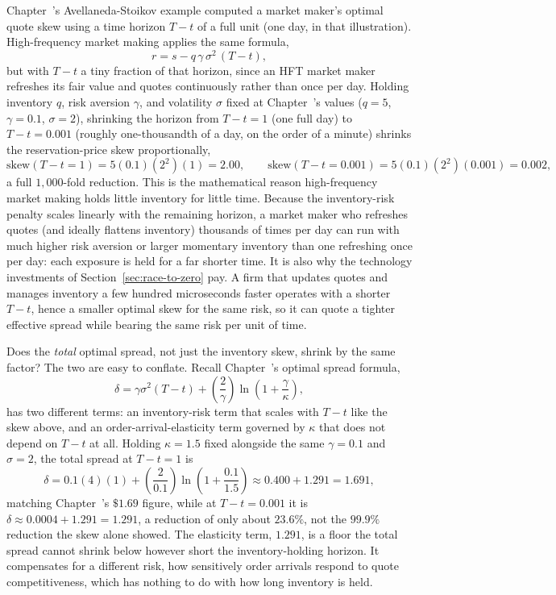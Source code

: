 \documentclass[../ai_in_finance]{subfiles}
\begin{document}
Chapter~'s Avellaneda-Stoikov example computed a market maker's optimal quote skew using a time horizon $T-t$ of a full unit (one day, in that illustration). High-frequency market making applies the same formula,
\begin{equation}
r = s - q\,\gamma\,\sigma^2\,(T-t),
\label{eq:hft-reservation}
\end{equation}
but with $T-t$ a tiny fraction of that horizon, since an HFT market maker refreshes its fair value and quotes continuously rather than once per day. Holding inventory $q$, risk aversion $\gamma$, and volatility $\sigma$ fixed at Chapter~'s values ($q=5$, $\gamma=0.1$, $\sigma=2$), shrinking the horizon from $T-t=1$ (one full day) to $T-t=0.001$ (roughly one-thousandth of a day, on the order of a minute) shrinks the reservation-price skew proportionally,
\begin{equation*}
\text{skew}(T{-}t=1) = 5(0.1)(2^2)(1) = 2.00, \qquad \text{skew}(T{-}t=0.001) = 5(0.1)(2^2)(0.001) = 0.002,
\end{equation*}
a full $1{,}000$-fold reduction. This is the mathematical reason high-frequency market making holds little inventory for little time. Because the inventory-risk penalty scales linearly with the remaining horizon, a market maker who refreshes quotes (and ideally flattens inventory) thousands of times per day can run with much higher risk aversion or larger momentary inventory than one refreshing once per day: each exposure is held for a far shorter time. It is also why the technology investments of Section~\ref{sec:race-to-zero} pay. A firm that updates quotes and manages inventory a few hundred microseconds faster operates with a shorter $T-t$, hence a smaller optimal skew for the same risk, so it can quote a tighter effective spread while bearing the same risk per unit of time.

Does the \emph{total} optimal spread, not just the inventory skew, shrink by the same factor? The two are easy to conflate. Recall Chapter~'s optimal spread formula,
\begin{equation}
\delta = \gamma\sigma^2(T-t) + \left(\frac{2}{\gamma}\right)\ln\left(1+\frac{\gamma}{\kappa}\right),
\label{eq:hft-optimal-spread}
\end{equation}
has two different terms: an inventory-risk term that scales with $T-t$ like the skew above, and an order-arrival-elasticity term governed by $\kappa$ that does not depend on $T-t$ at all. Holding $\kappa=1.5$ fixed alongside the same $\gamma=0.1$ and $\sigma=2$, the total spread at
$T-t=1$ is
$$\delta=0.1(4)(1)+\left(\frac{2}{0.1}\right)\ln\left(1+\frac{0.1}{1.5}\right)\approx0.400+1.291=1.691,$$
matching Chapter~'s $\$1.69$ figure, while at $T-t=0.001$ it is $\delta\approx0.0004+1.291=1.291$, a reduction of only about $23.6\%$, not the $99.9\%$
reduction the skew alone showed. The elasticity term, $1.291$, is a floor the total spread cannot shrink below however short the
inventory-holding horizon. It compensates for a different risk, how sensitively order arrivals respond
to quote competitiveness, which has nothing to do with how long inventory is held.
\end{document}
